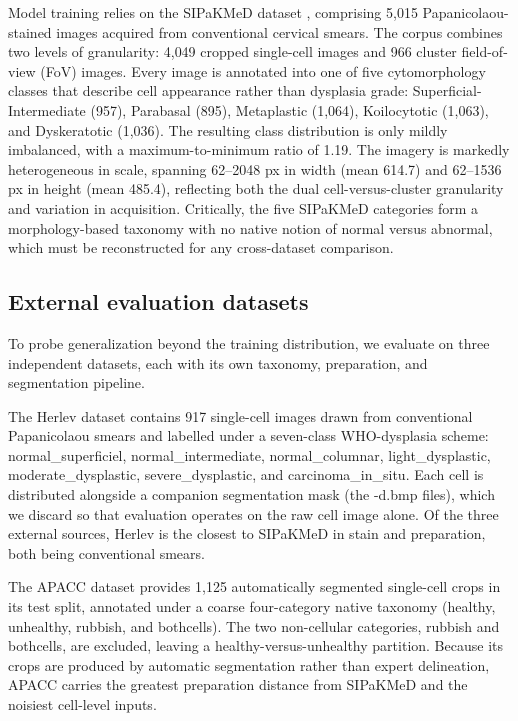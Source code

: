 \documentclass[twocolumn]{article}
\begin{document}
Model training relies on the SIPaKMeD dataset \citep{plissiti2018sipakmed}, comprising 5{,}015 Papanicolaou-stained images acquired from conventional cervical smears. The corpus combines two levels of granularity: 4{,}049 cropped single-cell images and 966 cluster field-of-view (FoV) images. Every image is annotated into one of five cytomorphology classes that describe cell appearance rather than dysplasia grade: Superficial-Intermediate (957), Parabasal (895), Metaplastic (1{,}064), Koilocytotic (1{,}063), and Dyskeratotic (1{,}036). The resulting class distribution is only mildly imbalanced, with a maximum-to-minimum ratio of 1.19. The imagery is markedly heterogeneous in scale, spanning 62--2048 px in width (mean 614.7) and 62--1536 px in height (mean 485.4), reflecting both the dual cell-versus-cluster granularity and variation in acquisition. Critically, the five SIPaKMeD categories form a morphology-based taxonomy with no native notion of normal versus abnormal, which must be reconstructed for any cross-dataset comparison.

\subsection{External evaluation datasets}

To probe generalization beyond the training distribution, we evaluate on three independent datasets, each with its own taxonomy, preparation, and segmentation pipeline.

The Herlev dataset \citep{jantzen2005herlev} contains 917 single-cell images drawn from conventional Papanicolaou smears and labelled under a seven-class WHO-dysplasia scheme: normal\_superficiel, normal\_intermediate, normal\_columnar, light\_dysplastic, moderate\_dysplastic, severe\_dysplastic, and carcinoma\_in\_situ. Each cell is distributed alongside a companion segmentation mask (the {-d.bmp} files), which we discard so that evaluation operates on the raw cell image alone. Of the three external sources, Herlev is the closest to SIPaKMeD in stain and preparation, both being conventional smears.

The APACC dataset provides 1{,}125 automatically segmented single-cell crops in its test split, annotated under a coarse four-category native taxonomy (healthy, unhealthy, rubbish, and bothcells). The two non-cellular categories, rubbish and bothcells, are excluded, leaving a healthy-versus-unhealthy partition. Because its crops are produced by automatic segmentation rather than expert delineation, APACC carries the greatest preparation distance from SIPaKMeD and the noisiest cell-level inputs.
\end{document}
